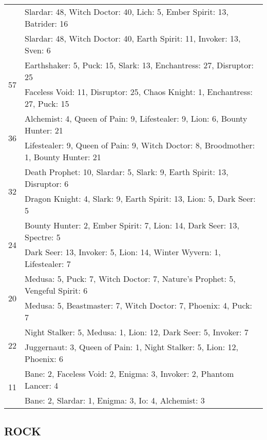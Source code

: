 \documentclass[result.tex]{subfiles}
\begin{document}
\begin{table}[H]
\begin{tabular}{ | c | p{12.5cm} | }
    & Slardar: 48, Witch Doctor: 40, Lich: 5, Ember Spirit: 13, Batrider: 16 \\
    & Slardar: 48, Witch Doctor: 40, Earth Spirit: 11, Invoker: 13, Sven: 6 \\
    \hline
    \multirow{2}{*}{57}
    & Earthshaker: 5, Puck: 15, Slark: 13, Enchantress: 27, Disruptor: 25 \\
    & Faceless Void: 11, Disruptor: 25, Chaos Knight: 1, Enchantress: 27, Puck: 15 \\
    \hline
    \multirow{2}{*}{36}
    & Alchemist: 4, Queen of Pain: 9, Lifestealer: 9, Lion: 6, Bounty Hunter: 21 \\
    & Lifestealer: 9, Queen of Pain: 9, Witch Doctor: 8, Broodmother: 1, Bounty Hunter: 21 \\
    \hline
    \multirow{2}{*}{32}
    & Death Prophet: 10, Slardar: 5, Slark: 9, Earth Spirit: 13, Disruptor: 6 \\
    & Dragon Knight: 4, Slark: 9, Earth Spirit: 13, Lion: 5, Dark Seer: 5 \\
    \hline
    \multirow{2}{*}{24}
    & Bounty Hunter: 2, Ember Spirit: 7, Lion: 14, Dark Seer: 13, Spectre: 5 \\
    & Dark Seer: 13, Invoker: 5, Lion: 14, Winter Wyvern: 1, Lifestealer: 7 \\
    \hline
    \multirow{2}{*}{20}
    & Medusa: 5, Puck: 7, Witch Doctor: 7, Nature's Prophet: 5, Vengeful Spirit: 6 \\
    & Medusa: 5, Beastmaster: 7, Witch Doctor: 7, Phoenix: 4, Puck: 7 \\
    \hline
    \multirow{2}{*}{22}
    & Night Stalker: 5, Medusa: 1, Lion: 12, Dark Seer: 5, Invoker: 7 \\
    & Juggernaut: 3, Queen of Pain: 1, Night Stalker: 5, Lion: 12, Phoenix: 6 \\
    \hline
    \multirow{2}{*}{11}
    & Bane: 2, Faceless Void: 2, Enigma: 3, Invoker: 2, Phantom Lancer: 4 \\
    & Bane: 2, Slardar: 1, Enigma: 3, Io: 4, Alchemist: 3 \\
    \hline
  \end{tabular}
  \caption{}
  \label{}
\end{table}

\newpage

\subsection*{ROCK}
\end{document}
